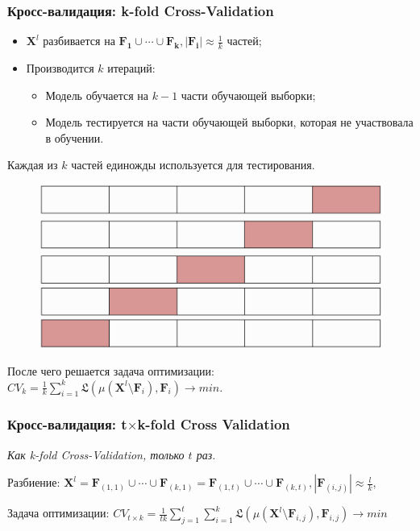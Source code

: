 \documentclass[11pt]{beamer}
\begin{document}
    \begin{frame}
		\frametitle{Кросс-валидация: k-fold Cross-Validation}
		\begin{itemize}
			\item $\bm{X}^l$ разбивается на $ \bm{F_1}\cup\cdots\cup\bm{F_k}, |\bm{F_i}|\approx \frac{1}{k} $ частей;
			\item Производится $ k $ итераций:
			\begin{itemize}
				\item Модель обучается на $ k-1 $ части обучающей выборки;
				\item Модель тестируется на части обучающей выборки, которая не участвовала в обучении.
			\end{itemize}
		\end{itemize}
		Каждая из $ k $ частей единожды используется для тестирования.
		
		\begin{figure}
			\includegraphics[width=0.4\linewidth]{imgs/K-fold-validation}
		\end{figure}
		После чего решается задача оптимизации:
		$CV_k = \frac{1}{k}\sum\limits_{i=1}^k\mathfrak{L}(\mu(\bm{X}^l \setminus \bm{F}_i), \bm{F}_i) \rightarrow min$.
	\end{frame}

	\begin{frame}
		\frametitle{Кросс-валидация: t$\times$k-fold Cross Validation}
		\begin{center}
			\textit{Как k-fold Cross-Validation, только $t$ раз.}
		\end{center}
		
		Разбиение:
		$\bm{X}^l = \bm{F}_{(1,1)}\cup\cdots\cup\bm{F}_{(k,1)}=\bm{F}_{(1,t)}\cup\cdots\cup\bm{F}_{(k,t)},|\bm{F}_{(i,j)}|\approx \frac{l}{k} $, 
		 
		Задача оптимизации: 
		$CV_{t\times k} = \frac{1}{tk}\sum\limits_{j=1}^t\sum\limits_{i=1}^k\mathfrak{L}(\mu(\bm{X}^l \setminus \bm{F}_{i,j}), \bm{F}_{i,j}) \rightarrow min$
	\end{frame}
\end{document}
